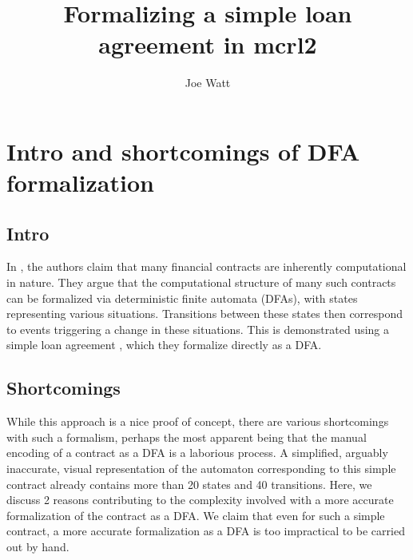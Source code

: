 \documentclass{article}
\title{Formalizing a simple loan agreement in mcrl2}
\author{Joe Watt}
\begin{document}
\maketitle


\tableofcontents

\section{Intro and shortcomings of DFA formalization}

\subsection{Intro}


In \cite{contract_as_automaton}, the authors claim that many financial
contracts are inherently computational in nature.
They argue that the computational structure of many such contracts
can be formalized via deterministic finite automata (DFAs), with states
representing various situations.
Transitions between these states then correspond to events triggering a change
in these situations.
This is demonstrated using a simple loan agreement
\cite[Table 1]{contract_as_automaton}, which they formalize
directly as a DFA.

\subsection{Shortcomings}

While this approach is a nice proof of concept, there are various shortcomings
with such a formalism, perhaps the most apparent being that the manual encoding
of a contract as a DFA is a laborious process.
A simplified, arguably inaccurate, visual representation of the automaton
\cite[Fig. 1]{contract_as_automaton}
corresponding to this simple contract already contains more than 20 states and
40 transitions.
Here, we discuss 2 reasons contributing to the complexity involved with a more
accurate formalization of the contract as a DFA.
We claim that even for such a simple contract, a more accurate formalization
as a DFA is too impractical to be carried out by hand.
\end{document}
